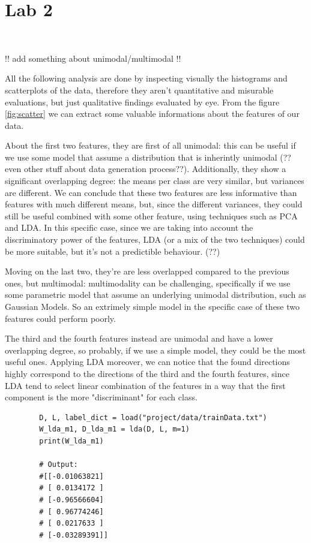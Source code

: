 
\section{Lab 2}
\

!! add something about unimodal/multimodal !!

All the following analysis are done by inspecting visually the
histograms and scatterplots of the data, therefore they aren't quantitative and misurable
evaluations, but just qualitative findings evaluated by eye.
From the figure \ref{fig:scatter} we can extract some valuable informations about the features of our
data.

About the first two features, they are first of all unimodal: this can be useful if we use some
model that assume a distribution that is inherintly unimodal (??even other stuff about data generation
process??).
Additionally, they show a significant overlapping degree: the means per class are very similar, but variances are different.
We can conclude that these two features are less informative than features with much different means,
but, since the different variances, they could still be useful combined with some other feature,
using techniques such as PCA and LDA. In this specific case, since we are taking
into account the discriminatory power of the features, LDA (or a mix of the two techniques)
could be more suitable, but it's not a predictible behaviour. (??)

Moving on the last two, they're are less overlapped compared to the previous ones, but multimodal: multimodality can be challenging,
specifically if we use some parametric model that assume an underlying unimodal distribution, such
as Gaussian Models. So an extrimely simple model in the specific case of these two features could perform poorly.

The third and the fourth features instead are unimodal and have a lower overlapping degree,
so probably, if we use a simple model, they could be the most useful ones. 
Applying LDA moreover, we can notice that the found directions highly correspond
to the directions of the third and the fourth features, since LDA
tend to select linear combination of the features in a way that the first component
is the more "discriminant" for each class.

\begin{center}
    \begin{lstlisting}
        D, L, label_dict = load("project/data/trainData.txt")
        W_lda_m1, D_lda_m1 = lda(D, L, m=1)
        print(W_lda_m1)
        
        # Output:
        #[[-0.01063821]
        # [ 0.0134172 ]
        # [-0.96566604]
        # [ 0.96774246]
        # [ 0.0217633 ]
        # [-0.03289391]]
        
    \end{lstlisting}
\end{center}
    
